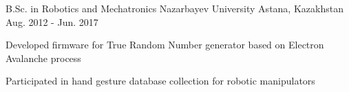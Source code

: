 
\begin{cventries}
      \cventry
        {B.Sc. in Robotics and Mechatronics} %
        {Nazarbayev University} %
        {Astana, Kazakhstan} %
        {Aug. 2012 - Jun. 2017} %
        {
          \begin{cvitems} %
            \item {Developed firmware for True Random Number generator based on Electron Avalanche process}
            \item {Participated in hand gesture database collection for robotic manipulators}
          \end{cvitems}
        }
    
    \end{cventries}
    